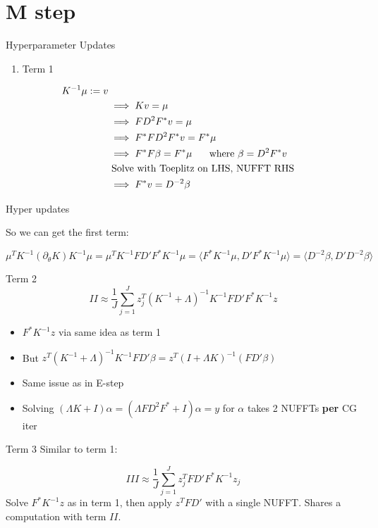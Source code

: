 \documentclass[aspectratio=169,xcolor=dvipsnames]{beamer}
\begin{document}
\section{M step}
\begin{frame}{Hyperparameter Updates}
    \begin{enumerate}
        \item Term 1
    \end{enumerate}

    \begin{align}
        K^{-1} \mu := v\\
        &\implies Kv  =\mu\\
        &\implies FD^2 F^* v = \mu\\
        &\implies F^* FD^2 F^* v = F^*\mu\\
        &\implies F^* F \beta = F^* \mu \hspace{0.5cm } \text{ where } \beta = D^2 F^* v\\
        & \text{ Solve with Toeplitz on LHS, NUFFT RHS}\\
        & \implies F^* v = D^{-2} \beta 
        \end{align}
\end{frame}
\begin{frame}{Hyper updates}
    

So we can get the first term:

$$\mu^T K^{-1} (\partial_\theta K)K^{-1} \mu = \mu^T K^{-1} FD'F^* K^{-1} \mu = \langle F^* K^{-1} \mu, D'F^* K^{-1} \mu\rangle = \langle D^{-2} \beta , D' D^{-2} \beta\rangle $$


\end{frame}
\begin{frame}{Term 2}
    $$II \approx \frac{1}{J} \sum_{j=1}^J z^T_j (K^{-1}+\Lambda)^{-1}K^{-1} FD'F^* K^{-1} z$$
\begin{itemize}
        \item $F^* K^{-1} z$ via same idea as term 1
        \item But $z^T (K^{-1}+\Lambda)^{-1} K^{-1} FD' \beta  = z^T (I + \Lambda K)^{-1} (FD'\beta)$
        \item Same issue as in E-step
        \item Solving $(\Lambda K + I)\alpha = (\Lambda FD^2 F^* + I)\alpha = y$ for $\alpha$ takes 2 NUFFTs \textbf{per} CG iter
\end{itemize}
\end{frame}
\begin{frame}{Term 3}
Similar to term 1:

$$III \approx \frac{1}{J} \sum_{j=1}^J z_j^T FD'F^* K^{-1} z_j$$
Solve $F^* K^{-1} z$ as in term 1, then apply 
$z^T FD'$ with a single NUFFT. Shares a computation with term $II$.   
    
\end{frame}
\end{document}
